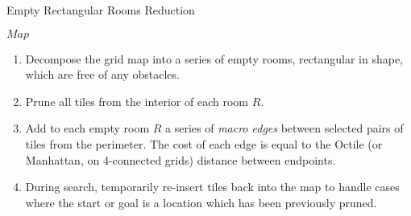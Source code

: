 \begin{algorithm}
\caption{Empty Rectangular Rooms Reduction}
\label{alg:rsr}
\begin{algorithmic}
\REQUIRE $Map$
\begin{enumerate}
\item{\label{alg:rsr:1} Decompose the grid map into a series of empty rooms, rectangular in shape, which are free of any obstacles.}
\item{\label{alg:rsr:2} Prune all tiles from the interior of each room $R$.}
\item{\label{alg:rsr:3} Add to each empty room $R$ a series of \emph{macro edges} between 
selected pairs of tiles from the perimeter. The cost of each edge is equal to
the Octile (or Manhattan, on 4-connected grids) distance between endpoints.}
\item{\label{alg:rsr:4} During search, temporarily re-insert tiles back into the map to handle cases where the
start or goal is a location which has been previously pruned.}
\end{enumerate}
\end{algorithmic}
\end{algorithm}
